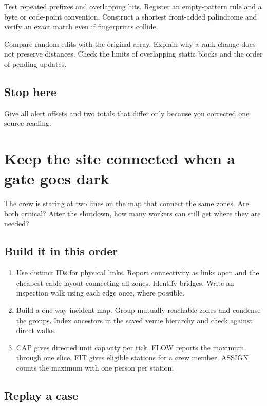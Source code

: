 \documentclass[11pt,letterpaper]{article}
\begin{document}
Test repeated prefixes and overlapping hits. Register an empty-pattern rule and a byte or code-point convention. Construct a shortest front-added palindrome and verify an exact match even if fingerprints collide.

Compare random edits with the original array. Explain why a rank change does not preserve distances. Check the limits of overlapping static blocks and the order of pending updates.

\subsection*{Stop here}

Give all alert offsets and two totals that differ only because you corrected one source reading.

\clearpage

\section{Keep the site connected when a gate goes dark}\label{festival:08}

The crew is staring at two lines on the map that connect the same zones. Are both critical? After the shutdown, how many workers can still get where they are needed?

\subsection*{Build it in this order}

\begin{enumerate}
\item Use distinct IDs for physical links. Report connectivity as links open and the cheapest cable layout connecting all zones. Identify bridges. Write an inspection walk using each edge once, where possible.
\item Build a one-way incident map. Group mutually reachable zones and condense the groups. Index ancestors in the saved venue hierarchy and check against direct walks.
\item CAP gives directed unit capacity per tick. FLOW reports the maximum through one slice. FIT gives eligible stations for a crew member. ASSIGN counts the maximum with one person per station.
\end{enumerate}

\subsection*{Replay a case}
\end{document}
